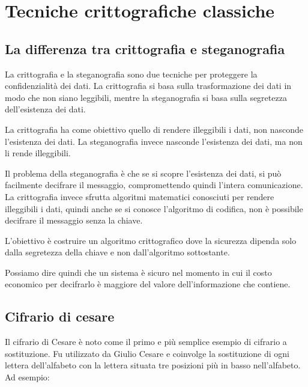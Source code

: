 \chapter{Tecniche crittografiche classiche}
\section{La differenza tra crittografia e steganografia}
La crittografia e la steganografia sono due tecniche per proteggere la
confidenzialità dei dati. 
La crittografia si basa sulla trasformazione
dei dati in modo che non siano leggibili, mentre la steganografia si
basa sulla segretezza dell'esistenza dei dati.

La crittografia ha come obiettivo quello di rendere illeggibili i dati,
non nasconde l'esistenza dei dati. La steganografia invece nasconde
l'esistenza dei dati, ma non li rende illeggibili.

Il problema della steganografia è che se si scopre l'esistenza dei dati,
si può facilmente decifrare il messaggio, compromettendo quindi l'intera 
comunicazione. La crittografia invece sfrutta algoritmi matematici conosciuti
per rendere illeggibili i dati, quindi anche se si conosce l'algoritmo di
codifica, non è possibile decifrare il messaggio senza la chiave.
\begin{tcolorbox}
    L'obiettivo è costruire un algoritmo crittografico dove la sicurezza 
    dipenda solo dalla segretezza della chiave e non dall'algoritmo sottostante.
\end{tcolorbox}
Possiamo dire quindi che un sistema è sicuro nel momento in cui il costo 
economico per decifrarlo è maggiore del valore dell'informazione che contiene.
\section{Cifrario di cesare}
Il cifrario di Cesare è noto come il primo e più semplice esempio di
cifrario a sostituzione. Fu utilizzato da Giulio Cesare e coinvolge la
sostituzione di ogni lettera dell'alfabeto con la lettera situata tre
posizioni più in basso nell'alfabeto. Ad esempio:

